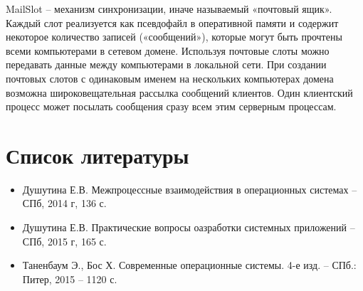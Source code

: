 \documentclass[a4paper]{article}
\begin{document}
	MailSlot – механизм синхронизации, иначе называемый «почтовый ящик». Каждый слот реализуется как псевдофайл в оперативной памяти и содержит некоторое количество записей («сообщений»), которые могут быть прочтены всеми компьютерами в сетевом домене. Используя почтовые слоты можно передавать данные между компьютерами в локальной сети. При создании почтовых слотов с одинаковым именем на нескольких компьютерах домена возможна широковещательная рассылка сообщений клиентов. Один клиентский процесс может посылать сообщения сразу всем этим серверным процессам.

\section{Список литературы}
\begin{itemize}
\item Душутина Е.В.  Межпроцессные взаимодействия в операционных системах – СПб, 2014 г, 136 с.
\item Душутина Е.В.  Практические вопросы оазработки системных приложений – СПб, 2015 г, 165 с.
\item Таненбаум Э., Бос Х. Современные операционные системы. 4-е изд. – СПб.: Питер, 2015 – 1120 с.
\end{itemize}
	
\end{document}
